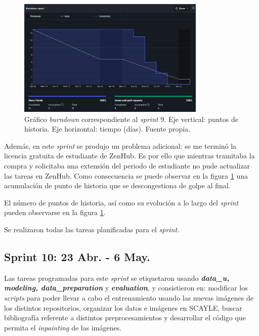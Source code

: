 \begin{figure}[h]
    \centering
    \includegraphics[width=0.8\textwidth]{img/bd_9abr.png}
    \caption{Gráfico \textit{burndown} correspondiente al \textit{sprint} 9. Eje vertical: puntos de historia. Eje horizontal: tiempo (días). Fuente propia.}
    \label{fig:bd_9}
\end{figure}

Además, en este \textit{sprint} se produjo un problema adicional: se me terminó la licencia gratuita de estudiante de ZenHub. Es por ello que mientras tramitaba la compra y solicitaba una extensión del periodo de estudiante no pude actualizar las tareas en ZenHub. Como consecuencia se puede observar en la figura \ref{fig:bd_9} una acumulación de punto de historia que se descongestiona de golpe al final.

El número de puntos de historia, así como su evolución a lo largo del \textit{sprint} pueden observarse en la figura \ref{fig:bd_9}.

Se realizaron todas las tareas planificadas para el \textit{sprint}.

\subsection{Sprint 10: 23 Abr. - 6 May.}

Las tareas programadas para este \textit{sprint} se etiquetaron usando \textbf{\textit{data\_u, modeling, data\_preparation}} y \textbf{\textit{evaluation}}, y consistieron en: modificar los \textit{scripts} para poder llevar a cabo el entrenamiento usando las nuevas imágenes de los distintos repositorios, organizar los datos e imágenes en SCAYLE, buscar bibliografía referente a distintos preprocesamientos y desarrollar el código que permita el \textit{inpainting} de las imágenes. 

